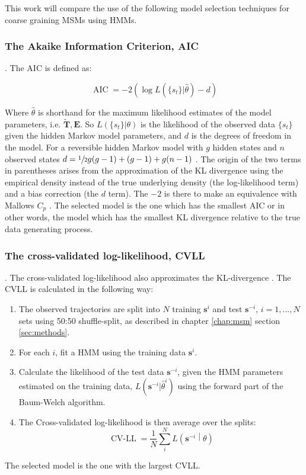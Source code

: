 This work will compare the use of the following model selection techniques for coarse graining MSMs using HMMs.  

\subsubsection{The Akaike Information Criterion, AIC}. The AIC is defined as:

\begin{equation}
    \operatorname{AIC} = -2\left(\log{L\left(\{s_t\}|\hat{\theta}\right)} - d\right)
\end{equation}

Where $\hat{\theta}$ is shorthand for the maximum likelihood estimates of the model parameters, i.e. $\tilde{\mathbf{T}}, \mathbf{E}$. So $L(\{s_t\}|\theta)$ is the likelihood of the observed data $\{s_t\}$ given the hidden Markov model parameters,  and $d$ is the degrees of freedom in the model. For a reversible hidden Markov model with $g$ hidden states and $n$ observed states  $d = \sfrac{1}{2}g(g-1) + (g-1) + g(n-1)$ \cite{trendelkamp-schroerEstimationUncertaintyReversible2015b}. The origin of the two terms in parentheses arises from the approximation of the KL divergence using the empirical density instead of the true underlying density (the log-likelihood term) and a bias correction (the $d$ term). The $-2$ is there to make an equivalence with Mallows $C_p$ \cite{friedman2001elements}. The selected model is the one which has the smallest AIC or in other words, the model which has the smallest KL divergence relative to the true data generating process. 

\subsubsection{The cross-validated log-likelihood, CVLL}. The cross-validated log-likelihood also approximates the KL-divergence \cite{celeuxSelectingHiddenMarkov2008}. The CVLL is calculated in the following way: 
\begin{enumerate}
    \item The observed trajectories are split into $N$ training $\mathbf{s}^{i}$ and test $\mathbf{s}^{-i}$, $i = 1, ..., N$ sets using 50:50 shuffle-split, as described in chapter \ref{chap:msm} section \ref{sec:methods}. 
    \item For each $i$, fit a HMM using the training data $\mathbf{s}^{i}$. 
    \item Calculate the likelihood of the test data $\mathbf{s}^{-i}$, given the HMM parameters estimated on the training data, $L(\mathbf{s}^{-i}|\hat{\theta}^{i})$ using the forward part of the Baum-Welch algorithm. 
    \item The Cross-validated log-likelihood is then average over the splits: 
    \begin{equation}
        \operatorname{CV-LL} = \frac{1}{N}\sum_{i}^{N}L\left(\mathbf{s}^{-i}\middle|\theta\right)
    \end{equation}
\end{enumerate}
The selected model is the one with the largest CVLL.  


